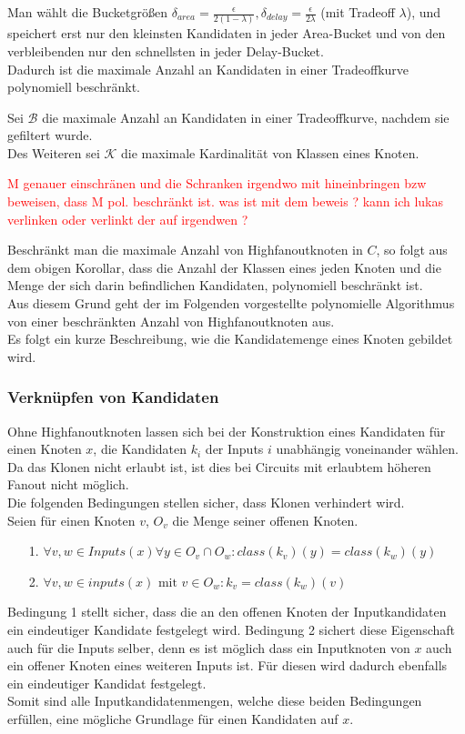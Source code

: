 \documentclass[11pt, a4paper, german]{article}
\begin{document}
Man wählt die Bucketgrößen $\delta_{area} = \frac{\epsilon}{2(1-\lambda)}, \delta_{delay} = \frac{\epsilon}{2\lambda}$ (mit Tradeoff $\lambda$), und speichert erst nur den kleinsten Kandidaten in jeder Area-Bucket und von den verbleibenden nur den schnellsten in jeder Delay-Bucket.\\
Dadurch ist die maximale Anzahl an Kandidaten in einer Tradeoffkurve polynomiell beschränkt. 
\begin{definition}
Sei $\mathcal{B}$ die maximale Anzahl an Kandidaten in einer Tradeoffkurve, nachdem sie gefiltert wurde.\\
Des Weiteren sei $\mathcal{K}$ die maximale Kardinalität von Klassen eines Knoten.
\end{definition}
\textcolor{red}{M genauer einschränen und die Schranken irgendwo mit hineinbringen bzw beweisen, dass M pol. beschränkt ist. }
\textcolor{red}{was ist mit dem beweis ? kann ich lukas verlinken oder verlinkt der auf irgendwen ?}

Beschränkt man die maximale Anzahl von Highfanoutknoten in $C$, so folgt aus dem obigen Korollar, dass die Anzahl der Klassen eines jeden Knoten und die Menge der sich darin befindlichen Kandidaten, polynomiell beschränkt ist. \\
Aus diesem Grund geht der im Folgenden vorgestellte polynomielle Algorithmus von einer beschränkten Anzahl von Highfanoutknoten aus.\\ 

Es folgt ein kurze Beschreibung, wie die Kandidatemenge eines Knoten gebildet wird.

\subsubsection{Verknüpfen von Kandidaten}
Ohne Highfanoutknoten lassen sich bei der Konstruktion eines Kandidaten für einen Knoten $x$, die Kandidaten $k_i$ der Inputs $i$ unabhängig voneinander wählen.
Da das Klonen nicht erlaubt ist, ist dies bei Circuits mit erlaubtem höheren Fanout nicht möglich.\\
Die folgenden Bedingungen stellen sicher, dass Klonen verhindert wird. \\
Seien für einen Knoten $v$, $O_v$ die Menge seiner offenen Knoten.
\begin{itemize}
	\item[1.] $\forall v,w \in Inputs(x) \forall y \in O_v \cap O_w : class(k_v)(y) = class(k_w)(y)$
	\item[2.] $\forall v,w \in inputs(x) \text{ mit } v \in O_w : k_v = class(k_w)(v)$
\end{itemize}
Bedingung 1 stellt sicher, dass die an den offenen Knoten der Inputkandidaten ein eindeutiger Kandidate festgelegt wird. Bedingung 2 sichert diese Eigenschaft auch für die Inputs selber, denn es ist möglich dass ein Inputknoten von $x$ auch ein offener Knoten eines weiteren Inputs ist. Für diesen wird dadurch ebenfalls ein eindeutiger Kandidat festgelegt. \\
Somit sind alle Inputkandidatenmengen, welche diese beiden Bedingungen erfüllen, eine mögliche Grundlage für einen Kandidaten auf $x$. 
\end{document}
